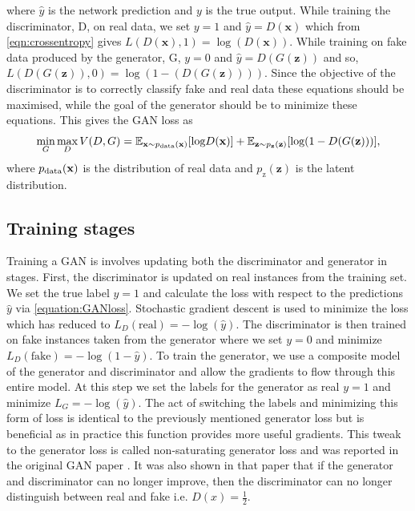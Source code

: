 \documentclass[12pt]{iopart}
\begin{document}
where $\hat{y}$ is the network prediction and $y$ is the true output. While training the discriminator, D, on real data, we set $y = 1$ and $\hat{y} = D(\mathbf{x})$ which from \cref{eqn:crossentropy} gives $L(D(\mathbf{x}),1) = \log(D(\mathbf{x}))$. While training on fake data produced by the generator, G, $y = 0$ and $\hat{y} = D(G(\mathbf{z}))$ and so, $L(D(G(\mathbf{z})),0) = \log(1-(D(G(\mathbf{z}))))$. Since the objective of the discriminator is to correctly classify fake and real data these equations should be maximised, while the goal of the generator should be to minimize these equations. This gives the \ac{GAN} loss as
%
\begin{equation}
   \mathop{\text{min}}_{G}  \mathop{\text{max}}_{D} V(D,G) = \mathbb{E}_{\mathbf{x} \sim p_{\text{\text{data}}}(\mathbf{x})} [\text{log} D(\mathbf{x})] + \mathbb{E}_{\mathbf{z} \sim p_{\mathbf{z}}(\mathbf{z})} [\text{log}(1-D(G(\mathbf{z})))],
 \label{equation:GANloss}
 \end{equation}
where $p_{\text{\text{data}}}(\mathbf{x})$ is the distribution of real data and $p_{\text{z}}(\mathbf{z})$ is the latent distribution. 

\subsection{Training stages}
%
Training a GAN is involves updating both the discriminator and generator in stages. First, the discriminator is updated on real instances from the training set. We set the true label $y=1$ and calculate the loss with respect to the predictions $\hat{y}$ via \cref{equation:GANloss}. Stochastic gradient descent is used to minimize the loss which has reduced to $L_D(\textrm{real}) = -\log(\hat{y})$. The discriminator is then trained on fake instances taken from the generator where we set $y=0$ and minimize $L_D(\textrm{fake}) = -\log(1-\hat{y})$. To train the generator, we use a composite model of the generator and discriminator and allow the gradients to flow through this entire model. At this step we set the labels for the generator as real $y=1$ and minimize $L_G = -\log(\hat{y})$. The act of switching the labels and minimizing this form of loss is identical to the previously mentioned generator loss but is beneficial as in practice this function provides more useful gradients. This tweak to the generator loss is called non-saturating generator loss and was reported in the original \ac{GAN} paper \cite{Goodfellow2014}. It was also shown in that paper that if the generator and discriminator can no longer improve, then the discriminator can no longer distinguish between real and fake i.e. $D(x) = \frac{1}{2}$. 
\end{document}
